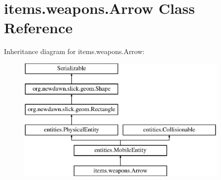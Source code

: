\hypertarget{classitems_1_1weapons_1_1_arrow}{}\section{items.\+weapons.\+Arrow Class Reference}
\label{classitems_1_1weapons_1_1_arrow}
Inheritance diagram for items.\+weapons.\+Arrow\+:\begin{figure}[H]
\begin{center}
\leavevmode
\includegraphics[height=6.000000cm]{classitems_1_1weapons_1_1_arrow}
\end{center}
\end{figure}
